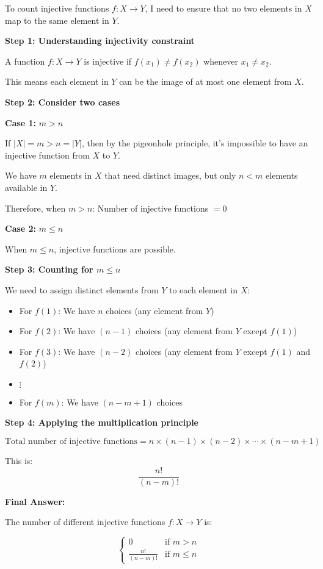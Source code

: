 \documentclass[12pt,a4paper]{article}
\theoremstyle{definition}
\theoremstyle{remark}
\begin{document}
To count injective functions $f : X \to Y$, I need to ensure that no two elements in $X$ map to the same element in $Y$.

\textbf{Step 1: Understanding injectivity constraint}

A function $f : X \to Y$ is injective if $f(x_1) \neq f(x_2)$ whenever $x_1 \neq x_2$.

This means each element in $Y$ can be the image of at most one element from $X$.

\textbf{Step 2: Consider two cases}

\textbf{Case 1:} $m > n$

If $|X| = m > n = |Y|$, then by the pigeonhole principle, it's impossible to have an injective function from $X$ to $Y$.

We have $m$ elements in $X$ that need distinct images, but only $n < m$ elements available in $Y$.

Therefore, when $m > n$: Number of injective functions $= 0$

\textbf{Case 2:} $m \leq n$

When $m \leq n$, injective functions are possible.

\textbf{Step 3: Counting for $m \leq n$}

We need to assign distinct elements from $Y$ to each element in $X$:

\begin{itemize}
\item For $f(1)$: We have $n$ choices (any element from $Y$)
\item For $f(2)$: We have $(n-1)$ choices (any element from $Y$ except $f(1)$)
\item For $f(3)$: We have $(n-2)$ choices (any element from $Y$ except $f(1)$ and $f(2)$)
\item $\vdots$
\item For $f(m)$: We have $(n-m+1)$ choices
\end{itemize}

\textbf{Step 4: Applying the multiplication principle}

$$\text{Total number of injective functions} = n \times (n-1) \times (n-2) \times \cdots \times (n-m+1)$$

This is: $$\frac{n!}{(n-m)!}$$

\textbf{Final Answer:}

The number of different injective functions $f : X \to Y$ is:

$$\begin{cases}
0 & \text{if } m > n \\
\frac{n!}{(n-m)!} & \text{if } m \leq n
\end{cases}$$
\end{document}

